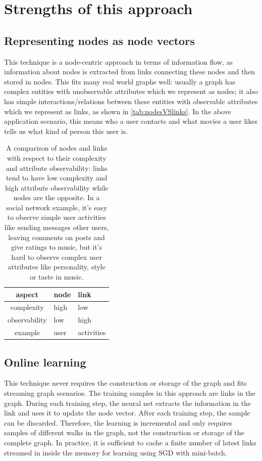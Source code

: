 \documentclass{article}
\begin{document}
\section{Strengths of this approach}

\subsection{Representing nodes as node vectors}
This technique is a node-centric approach in terms of information flow, as 
information about nodes is extracted from links connecting these nodes and then 
stored in nodes.
This fits many real world graphs well: usually a graph has complex entities 
with unobservable attributes which we represent as nodes; it also has simple 
interactions/relations between these entities with observable attributes which 
we represent as links, as shown in \autoref{tab:nodesVSlinks}.
In the above application scenario, this means who a user contacts and what 
movies a user likes tells us what kind of person this user is.
\begin{table}[H]
	\centering
	\begin{tabularx}{0.5\textwidth}{ |c|X|X| } \hline
		aspect  & node & link \\ \hline
		complexity & high & low \\ \hline
		observability & low & high \\ \hline
		example & user & activities \\ \hline
	\end{tabularx}
	\caption{A comparison of nodes and links with respect to their complexity 
		and attribute observability: links tend to have low complexity and high 
		attribute observability while nodes are the opposite. In a social 
		network 
		example, it's easy to observe simple user activities like sending 
		messages 
		other users, leaving comments on posts and give ratings to music, but 
		it's 
		hard to observe complex user attributes like personality, style or 
		taste in 
		music.}
	\label{tab:nodesVSlinks}
\end{table}

\subsection{Online learning}
This technique never requires the construction or storage of the graph and fits 
streaming graph scenarios.
The training samples in this approach are links in the graph.
During each training step, the neural net extracts the information in the link 
and uses it to update the node vector.
After each training step, the sample can be discarded.
Therefore, the learning is incremental and only requires samples of different 
walks in the graph, not the construction or storage of the complete graph.
In practice, it is sufficient to cache a finite number of latest links streamed 
in inside the memory for learning using SGD with mini-batch.
\end{document}

